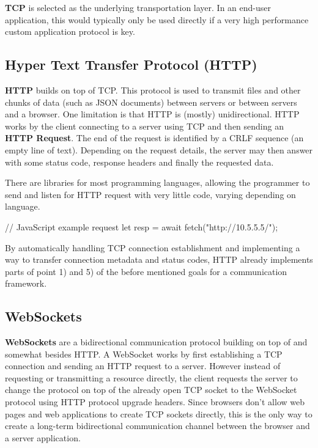 \documentclass[conference]{IEEEtran}
\begin{document}
\textbf{TCP} is selected as the underlying transportation layer. In an end-user application, this would typically only be used directly if a very high performance custom application protocol is key.


\subsection{Hyper Text Transfer Protocol (HTTP)}

\textbf{HTTP} builds on top of TCP. This protocol is used to transmit files and other chunks of data (such as JSON documents) between servers or between servers and a browser. One limitation is that HTTP is (mostly) unidirectional. HTTP works by the client connecting to a server using TCP and then sending an \textbf{HTTP Request}. The end of the request is identified by a CRLF sequence (an empty line of text). Depending on the request details, the server may then answer with some status code, response headers and finally the requested data. \cite{http-mdn}

There are libraries for most programming languages, allowing the programmer to send and listen for HTTP request with very little code, varying depending on language.

\begin{code-js}
// JavaScript example request
let resp = await fetch("http://10.5.5.5/");
\end{code-js}

By automatically handling TCP connection establishment and implementing a way to transfer connection metadata and status codes, HTTP already implements parts of point 1) and 5) of the before mentioned goals for a communication framework. \cite{http-mdn}


\subsection{WebSockets}

\textbf{WebSockets} are a bidirectional communication protocol building on top of and somewhat besides HTTP. A WebSocket works by first establishing a TCP connection and sending an HTTP request to a server. However instead of requesting or transmitting a resource directly, the client requests the server to change the protocol on top of the already open TCP socket to the WebSocket protocol using HTTP protocol upgrade headers. Since browsers don't allow web pages and web applications to create TCP sockets directly, this is the only way to create a long-term bidirectional communication channel between the browser and a server application. \cite{b3}
\end{document}
